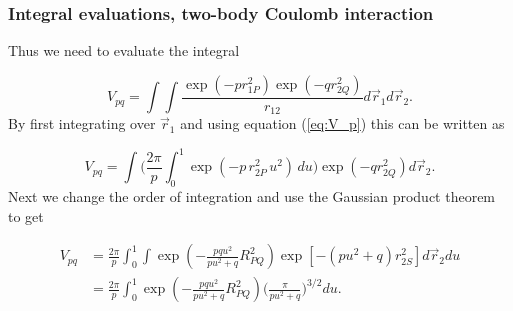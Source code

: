 \documentclass{beamer}
\begin{document}
\begin{frame}
\frametitle{Integral evaluations, two-body Coulomb interaction}

\begin{block}{}

Thus we need to evaluate the integral

\begin{equation}
 V_{pq} = \int\int\frac{\exp(-pr^2_{1P})\exp(-qr^2_{2Q})}{r_{12}}d \vec r_1 d\vec r_2.
\end{equation}
By first integrating over $\vec r_1$ and using equation (\ref{eq:V_p}) this can be written as

\begin{equation}
 V_{pq} = \int\Big(\frac{2\pi}{p}\int_0^1\exp(-p\,r^2_{2P}\,u^2)\,du\Big)\exp(-qr^2_{2Q}) d \vec r_2.
\end{equation}
Next we change the order of integration and use the Gaussian product theorem to get

\begin{equation}
\begin{split}
 V_{pq} & = \frac{2\pi}{p}\int_0^1\int\exp(-\frac{pqu^2}{pu^2+q}R^2_{PQ})\exp[-(pu^2+q)r_{2S}^2] d\vec r_2 du \\
        & = \frac{2\pi}{p}\int_0^1\exp(-\frac{pqu^2}{pu^2+q}R^2_{PQ})\Big(\frac{\pi}{pu^2+q}\Big)^{3/2} du.
\end{split}
\end{equation}
\end{block}
\end{frame}
\end{document}
